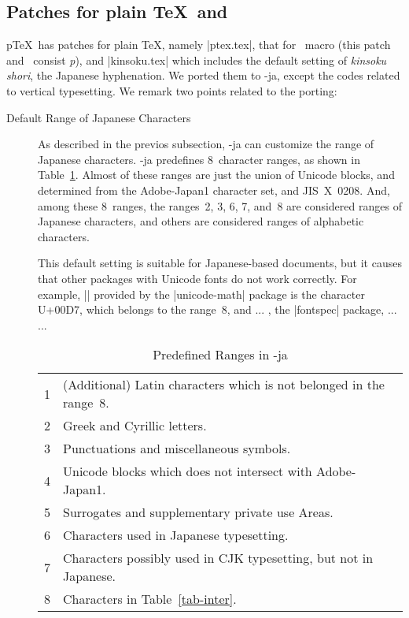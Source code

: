 \documentclass{ajt}
\begin{document}
\subsection{Patches for plain \TeX\ and \LaTeXe}
p\TeX\ has patches for plain \TeX, namely |ptex.tex|, that for \LaTeXe\
macro (this patch and \LaTeXe\ consist \emph{p\LaTeXe}), and
|kinsoku.tex| which includes the default setting of \emph{kinsoku
shori}, the Japanese hyphenation.  We ported them to \LuaTeX-ja, except
the codes related to vertical typesetting. We remark two points related to the porting:
\begin{description}
\item[Default Range of Japanese Characters] 
As described in the previos subsection, \LuaTeX-ja can customize the
range of Japanese characters.  \LuaTeX-ja predefines 8~character ranges,
as shown in Table~\ref{tab-chrrng}.  Almost of these ranges are just the
union of Unicode blocks, and determined from the Adobe-Japan1 character
set, and JIS~X~0208.  And, among these 8~ranges, the ranges~2, 3, 6, 7,
and~8 are considered ranges of Japanese characters, and others are
considered ranges of alphabetic characters.

This default setting is suitable for Japanese-based documents, but it
	   causes that other packages with Unicode fonts do not work
	   correctly. For example, |\times| provided by the
	   |unicode-math| package is the character U+00D7, which belongs
	   to the range~8, and ...
, the |fontspec| package, ... 
...

\begin{table}
\caption{Predefined Ranges in \LuaTeX-ja}
\label{tab-chrrng}
\begin{center}
\begin{tabular}{@{\bf}rl}
1&(Additional) Latin characters which is not belonged in the range~8.\\
2&Greek and Cyrillic letters.\\
3&Punctuations and miscellaneous symbols.\\
4&Unicode blocks which does not intersect with Adobe-Japan1.\\
5&Surrogates and supplementary private use Areas.\\
6&Characters used in Japanese typesetting.\\
7&Characters possibly used in CJK typesetting, but not in Japanese.\\
8&Characters in Table~\ref{tab-inter}.
\end{tabular}
\end{center}
\end{table}



\end{description}
\end{document}
